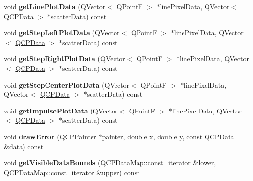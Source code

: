\begin{DoxyCompactItemize}
void {\bfseries get\+Line\+Plot\+Data} (Q\+Vector$<$ Q\+PointF $>$ $\ast$line\+Pixel\+Data, Q\+Vector$<$ \mbox{\hyperlink{class_q_c_p_data}{Q\+C\+P\+Data}} $>$ $\ast$scatter\+Data) const
\item 
\mbox{\label{class_q_c_p_graph_a8f8ae9cb4aa312c2085c3f6f298f19d4}} 
void {\bfseries get\+Step\+Left\+Plot\+Data} (Q\+Vector$<$ Q\+PointF $>$ $\ast$line\+Pixel\+Data, Q\+Vector$<$ \mbox{\hyperlink{class_q_c_p_data}{Q\+C\+P\+Data}} $>$ $\ast$scatter\+Data) const
\item 
\mbox{\label{class_q_c_p_graph_a59fecb135f47db10e14d75018210bf80}} 
void {\bfseries get\+Step\+Right\+Plot\+Data} (Q\+Vector$<$ Q\+PointF $>$ $\ast$line\+Pixel\+Data, Q\+Vector$<$ \mbox{\hyperlink{class_q_c_p_data}{Q\+C\+P\+Data}} $>$ $\ast$scatter\+Data) const
\item 
\mbox{\label{class_q_c_p_graph_ab860d67ecc7e2d7253ab1f19032958c2}} 
void {\bfseries get\+Step\+Center\+Plot\+Data} (Q\+Vector$<$ Q\+PointF $>$ $\ast$line\+Pixel\+Data, Q\+Vector$<$ \mbox{\hyperlink{class_q_c_p_data}{Q\+C\+P\+Data}} $>$ $\ast$scatter\+Data) const
\item 
\mbox{\label{class_q_c_p_graph_aae73c001a78cbe54e55e6779d7a70957}} 
void {\bfseries get\+Impulse\+Plot\+Data} (Q\+Vector$<$ Q\+PointF $>$ $\ast$line\+Pixel\+Data, Q\+Vector$<$ \mbox{\hyperlink{class_q_c_p_data}{Q\+C\+P\+Data}} $>$ $\ast$scatter\+Data) const
\item 
\mbox{\label{class_q_c_p_graph_ab51aeba7e9d29754e58852cfad3436cc}} 
void {\bfseries draw\+Error} (\mbox{\hyperlink{class_q_c_p_painter}{Q\+C\+P\+Painter}} $\ast$painter, double x, double y, const \mbox{\hyperlink{class_q_c_p_data}{Q\+C\+P\+Data}} \&\mbox{\hyperlink{class_q_c_p_graph_acde1c0d1f6a817930489548396e6b3e6}{data}}) const
\item 
\mbox{\label{class_q_c_p_graph_abda485a2f71ebe00d890840acbb91516}} 
void {\bfseries get\+Visible\+Data\+Bounds} (Q\+C\+P\+Data\+Map\+::const\+\_\+iterator \&lower, Q\+C\+P\+Data\+Map\+::const\+\_\+iterator \&upper) const
\item 
\mbox{\label{class_q_c_p_graph_ae413e4ea50fea821a48ee2b3c4aaa055}} 

\end{DoxyCompactItemize}
